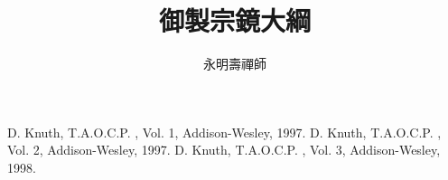 \documentclass[11pt]{ctexbook}
\begin{document}
\title{御製宗鏡大綱}
\author{永明壽禪師}
\date{}
\maketitle
\newpage

\tableofcontents    %
\newpage




%


\begin{thebibliography}{123456}
 D. Knuth, T.A.O.C.P. , Vol. 1, Addison-Wesley, 1997.
 D. Knuth, T.A.O.C.P. , Vol. 2, Addison-Wesley, 1997.
 D. Knuth, T.A.O.C.P. , Vol. 3, Addison-Wesley, 1998.
\end{thebibliography}


\printindex
\end{document}
